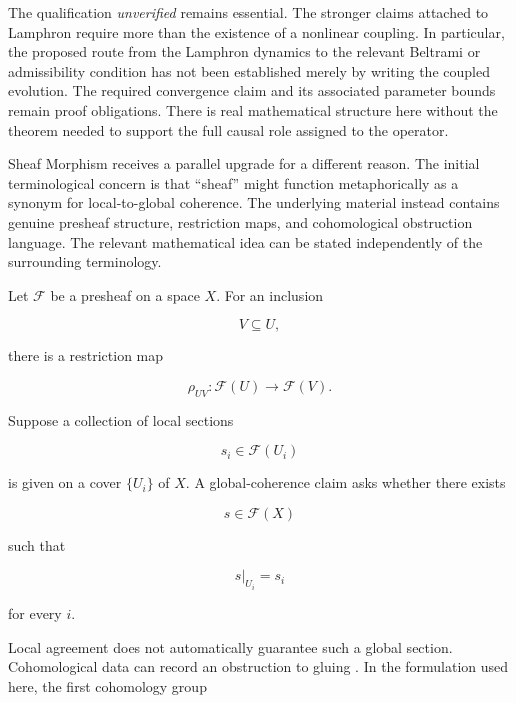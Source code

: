 \documentclass[11pt]{article}
\begin{document}
The qualification \emph{unverified} remains essential. The stronger claims attached to Lamphron require more than the existence of a nonlinear coupling. In particular, the proposed route from the Lamphron dynamics to the relevant Beltrami or admissibility condition has not been established merely by writing the coupled evolution. The required convergence claim and its associated parameter bounds remain proof obligations. There is real mathematical structure here without the theorem needed to support the full causal role assigned to the operator.

Sheaf Morphism receives a parallel upgrade for a different reason. The initial terminological concern is that ``sheaf'' might function metaphorically as a synonym for local-to-global coherence. The underlying material instead contains genuine presheaf structure, restriction maps, and cohomological obstruction language. The relevant mathematical idea can be stated independently of the surrounding terminology.

Let $\mathcal F$ be a presheaf on a space $X$. For an inclusion

\begin{equation}
V\subseteq U,
\end{equation}

there is a restriction map

\begin{equation}
\rho_{UV}:
\mathcal F(U)\longrightarrow\mathcal F(V).
\end{equation}

Suppose a collection of local sections

\begin{equation}
s_i\in\mathcal F(U_i)
\end{equation}

is given on a cover $\{U_i\}$ of $X$. A global-coherence claim asks whether there exists

\begin{equation}
s\in\mathcal F(X)
\end{equation}

such that

\begin{equation}
s|_{U_i}=s_i
\end{equation}

for every $i$.

Local agreement does not automatically guarantee such a global section. Cohomological data can record an obstruction to gluing \citep{Hartshorne1977}. In the formulation used here, the first cohomology group
\end{document}
